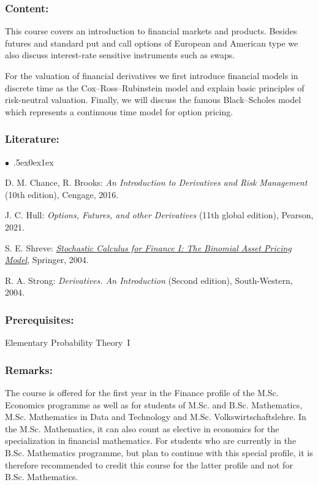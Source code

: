 \documentclass[a4paper,10pt]{article}
\renewenvironment{itemize}{\begin{list}{$\bullet$\ }{\itemsep.5ex\setlength{\topsep}{0.5\itemsep}\parsep0ex\labelsep1ex\settowidth{\labelwidth}{$\bullet$\ }\setlength{\leftmargin}{\labelwidth}\addtolength{\leftmargin}{3ex}\addtolength{\leftmargin}{\labelsep}}}{\end{list}}
\begin{document}
\subsubsection*{\large
    Content:
}
This course covers an introduction to financial markets and products. Besides futures and standard put and call options
of European and American type we also discuss interest-rate sensitive instruments such as swaps.

For the valuation of financial derivatives we first introduce financial models in discrete time as the Cox--Ross--Rubinstein
model and explain basic principles of risk-neutral valuation. Finally, we will discuss the famous Black--Scholes model
which represents a continuous time model for option pricing.
\subsubsection*{\large
    Literature:
}
\begin{itemize}
\item
D. M. Chance, R. Brooks: \emph{An Introduction to Derivatives and Risk Management} (10th edition), Cengage, 2016. 
\item
J. C. Hull: \emph{Options, Futures, and other Derivatives} (11th global edition), Pearson, 2021.
\item 
S. E. Shreve: \href{https://link.springer.com/book/10.1007/978-0-387-22527-2}{\emph{Stochastic Calculus for Finance I: The Binomial Asset Pricing Model}}, Springer, 2004. 
\item 
R. A. Strong: \emph{Derivatives. An Introduction} (Second edition), South-Western, 2004.
\end{itemize}
\subsubsection*{\large
    Prerequisites:
}
Elementary Probability Theory~I
\subsubsection*{\large
    Remarks:
}
The course  is offered for the first year in the Finance profile of the M.Sc. Economics programme as well as for students of M.Sc. and B.Sc. Mathematics, M.Sc. Mathematics in Data and Technology and M.Sc. Volkswirtschaftslehre. In the M.Sc. Mathematics, it can also count as elective in economics for the specialization in financial mathematics. For students who are currently in the B.Sc. Mathematics programme, but plan to continue with this special profile, it is therefore recommended to credit this course for the latter profile and not for B.Sc. Mathematics.
\end{document}
